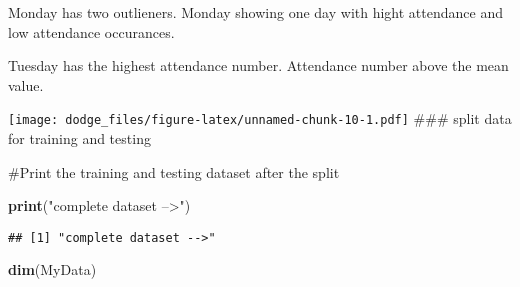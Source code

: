 \documentclass[]{article}
\newenvironment{Shaded}{\begin{snugshade}}{\end{snugshade}}
\newcommand{\CommentTok}[1]{\textcolor[rgb]{0.56,0.35,0.01}{\textit{#1}}}
\newcommand{\DataTypeTok}[1]{\textcolor[rgb]{0.13,0.29,0.53}{#1}}
\newcommand{\DecValTok}[1]{\textcolor[rgb]{0.00,0.00,0.81}{#1}}
\newcommand{\KeywordTok}[1]{\textcolor[rgb]{0.13,0.29,0.53}{\textbf{#1}}}
\newcommand{\NormalTok}[1]{#1}
\newcommand{\OperatorTok}[1]{\textcolor[rgb]{0.81,0.36,0.00}{\textbf{#1}}}
\newcommand{\OtherTok}[1]{\textcolor[rgb]{0.56,0.35,0.01}{#1}}
\newcommand{\StringTok}[1]{\textcolor[rgb]{0.31,0.60,0.02}{#1}}
\begin{document}
Monday has two outlieners. Monday showing one day with hight attendance
and low attendance occurances.

Tuesday has the highest attendance number. Attendance number above the
mean value.

\begin{Shaded}
\end{Shaded}

\texttt{[image: dodge\_files/figure-latex/unnamed-chunk-10-1.pdf]} \#\#\#
split data for training and testing

\begin{Shaded}
\end{Shaded}

\#Print the training and testing dataset after the split

\begin{Shaded}
\begin{Highlighting}[]
\KeywordTok{print}\NormalTok{(}\StringTok{"complete dataset -->"}\NormalTok{)}
\end{Highlighting}
\end{Shaded}

\begin{verbatim}
## [1] "complete dataset -->"
\end{verbatim}

\begin{Shaded}
\begin{Highlighting}[]
\KeywordTok{dim}\NormalTok{(MyData)}
\end{Highlighting}
\end{Shaded}
\end{document}
